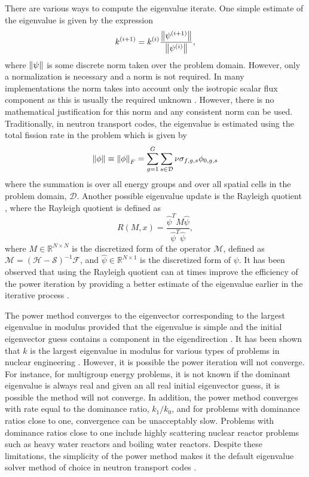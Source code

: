 There are various ways to compute the eigenvalue iterate. One simple estimate of the eigenvalue is given by the expression
\begin{equation}
k^{(i+1)} = k^{(i)} \frac{ \left\lVert\psi^{(i+1)}\right\rVert}{\left\lVert\psi^{(i)}\right\rVert},
\end{equation}
where $\left\lVert\psi\right\rVert$ is some discrete norm taken over the problem domain. However, only a normalization is necessary and a norm is not required. In many implementations the norm takes into account only the isotropic scalar flux component as this is usually the required unknown \cite{warsa2004krylov}. However, there is no mathematical justification for this norm and any consistent norm can be used. Traditionally, in neutron transport codes, the eigenvalue is estimated using the total fission rate in the problem \cite{warsa2004krylov} which is given by 
\begin{equation}
	\left\lVert\phi\right\rVert \equiv \left\lVert\phi\right\rVert_{F} = \sum_{g=1}^{G} \sum_{s \in \mathcal{D}} \nu \sigma_{f,g,s} \phi_{0,g,s}
\end{equation}
where the summation is over all energy groups and over all spatial cells in the problem domain, $\mathcal{D}$. Another possible eigenvalue update is the Rayleigh quotient \cite{horn_matrix_2012}, where the Rayleigh quotient is defined as
\begin{equation}
	R(M,x) = \frac{\hat{\psi}^{T}M\hat{\psi}}{\hat{\psi}^{T}\hat{\psi}},
\end{equation}
where $M \in \mathbb{R}^{N \times N}$ is the discretized form of the operator $\mathcal{M}$, defined as $\mathcal{M} = (\mathcal{H} - \mathcal{S})^{-1} \mathcal{F}$, and $\hat{\psi} \in \mathbb{R}^{N \times 1}$ is the discretized form of $\psi$. It has been observed that using the Rayleigh quotient can at times improve the efficiency of the power iteration by providing a better estimate of the eigenvalue earlier in the iterative process \cite{warsa2004krylov}.

The power method converges to the eigenvector corresponding to the largest eigenvalue in modulus provided that the eigenvalue is simple and the initial eigenvector guess contains a component in the eigendirection \cite{golub_matrix_2012}. It has been shown that $k$ is the largest eigenvalue in modulus for various types of problems in nuclear engineering \cite{modak_evaluation_1995}. However, it is possible the power iteration will not converge. For instance, for multigroup energy problems, it is not known if the dominant eigenvalue is always real and given an all real initial eigenvector guess, it is possible the method will not converge. In addition, the power method converges with rate equal to the dominance ratio, $k_{1}/k_{0}$, and for problems with dominance ratios close to one, convergence can be unacceptably slow. Problems with dominance ratios close to one include highly scattering nuclear reactor problems such as heavy water reactors and boiling water reactors. Despite these limitations, the simplicity of the power method makes it the default eigenvalue solver method of choice in neutron transport codes \cite{duderstadt_nuclear_1976}.


